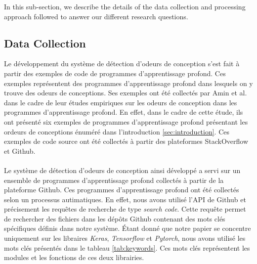 \label{sec:study design}
In this sub-section, we describe the details of the data collection and processing approach followed to answer our different research questions.





\subsection{Data Collection}
\label{sec:data collection}
Le développement du système de détection d'odeurs de conception s'est fait à
partir des exemples de code de programmes d'apprentissage profond. Ces exemples
représentent des programmes d'apprentissage profond dans lesquels on y trouve
des odeurs de conceptions. Ses exemples ont été collectés par Amin et al. dans
le cadre de leur études empiriques sur les odeurs de conception dans les
programmes d'apprentissage profond. En effet, dans le cadre de cette étude, ils
ont présenté six exemples de programmes d'apprentissage profond présentant les
ordeurs de conceptions énuméré dans l'introduction \ref{sec:introduction}. Ces
exemples de code source ont été collectés à partir des plateformes StackOverflow
et Github.\\\\

Le système de détection d'odeurs de conception ainsi développé a servi sur un
ensemble de programmes d'apprentissage profond collectés à partir de la
plateforme Github. Ces programmes d'apprentissage profond ont été collectés
selon un processus autimatiques. En effet, nous avons utilisé l'API de Github et
précisement les requêtes de recherche de type \emph{search code}. Cette requête
permet de rechercher des fichiers dans les dépôts Github contenant des mots clés
spécifiques définis dans notre système. Étant donné que notre papier se
concentre uniquement sur les libraires \emph{Keras}, \emph{Tensorflow} et \emph{Pytorch}, nous avons utilisé les mots
clés présentés dans le tableau \ref*{tab:keywords}. Ces mots clés
représentent les modules et les fonctions de ces deux librairies.\\


